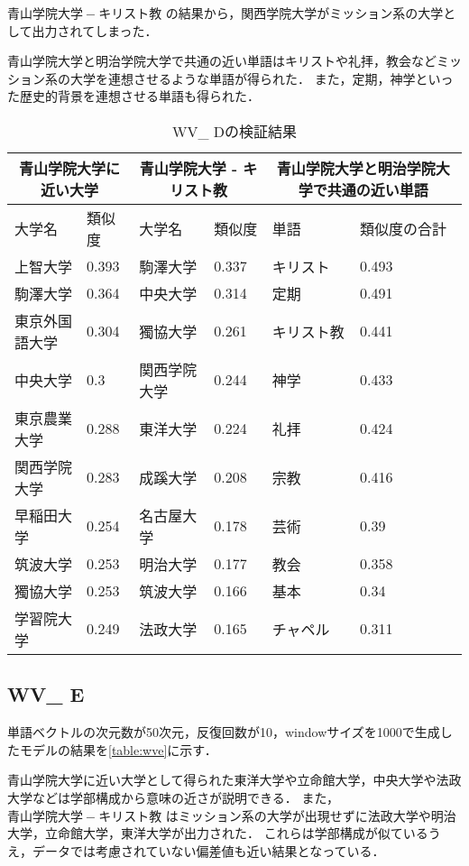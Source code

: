 $ 青山学院大学 - キリスト教 $ の結果から，関西学院大学がミッション系の大学として出力されてしまった．

青山学院大学と明治学院大学で共通の近い単語はキリストや礼拝，教会などミッション系の大学を連想させるような単語が得られた．
また，定期，神学といった歴史的背景を連想させる単語も得られた．


\begin{table}[H]
\caption{WV\_ Dの検証結果}
\centering
\footnotesize
\begin{tabular}{ll|ll|ll}
\hline
\multicolumn{2}{c}{青山学院大学に近い大学} & \multicolumn{2}{c}{青山学院大学 - キリスト教} & \multicolumn{2}{c}{青山学院大学と明治学院大学で共通の近い単語}
\\ \hline
大学名 & 類似度 & 大学名 & 類似度 & 単語 & 類似度の合計
\\ \hline \hline
上智大学 & 0.393 & 駒澤大学 & 0.337 & キリスト & 0.493\\
駒澤大学 & 0.364 & 中央大学 & 0.314 & 定期 & 0.491\\
東京外国語大学 & 0.304 & 獨協大学 & 0.261 & キリスト教 & 0.441\\
中央大学 & 0.3 & 関西学院大学 & 0.244 & 神学 & 0.433\\
東京農業大学 & 0.288 & 東洋大学 & 0.224 & 礼拝 & 0.424\\
関西学院大学 & 0.283 & 成蹊大学 & 0.208 & 宗教 & 0.416\\
早稲田大学 & 0.254 & 名古屋大学 & 0.178 & 芸術 & 0.39\\
筑波大学 & 0.253 & 明治大学 & 0.177 & 教会 & 0.358\\
獨協大学 & 0.253 & 筑波大学 & 0.166 & 基本 & 0.34\\
学習院大学 & 0.249 & 法政大学 & 0.165 & チャペル & 0.311\\ \hline
\end{tabular}
\label{table:wvd}
\end{table}

\subsection{WV\_ E}
単語ベクトルの次元数が50次元，反復回数が10，windowサイズを1000で生成したモデルの結果を\ref{table:wve}に示す．

青山学院大学に近い大学として得られた東洋大学や立命館大学，中央大学や法政大学などは学部構成から意味の近さが説明できる．
また，$ 青山学院大学 - キリスト教 $ はミッション系の大学が出現せずに法政大学や明治大学，立命館大学，東洋大学が出力された．
これらは学部構成が似ているうえ，データでは考慮されていない偏差値も近い結果となっている．

